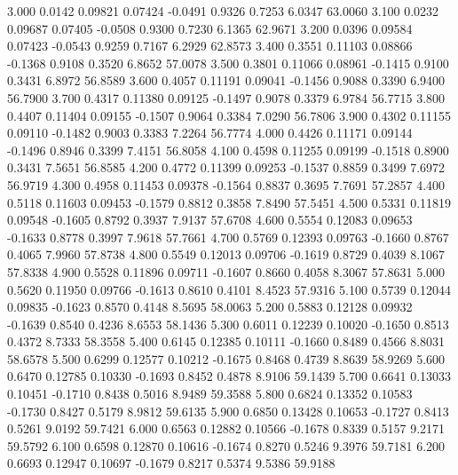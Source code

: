    3.000   0.0142   0.09821   0.07424  -0.0491   0.9326   0.7253   6.0347  63.0060
   3.100   0.0232   0.09687   0.07405  -0.0508   0.9300   0.7230   6.1365  62.9671
   3.200   0.0396   0.09584   0.07423  -0.0543   0.9259   0.7167   6.2929  62.8573
   3.400   0.3551   0.11103   0.08866  -0.1368   0.9108   0.3520   6.8652  57.0078
   3.500   0.3801   0.11066   0.08961  -0.1415   0.9100   0.3431   6.8972  56.8589
   3.600   0.4057   0.11191   0.09041  -0.1456   0.9088   0.3390   6.9400  56.7900
   3.700   0.4317   0.11380   0.09125  -0.1497   0.9078   0.3379   6.9784  56.7715
   3.800   0.4407   0.11404   0.09155  -0.1507   0.9064   0.3384   7.0290  56.7806
   3.900   0.4302   0.11155   0.09110  -0.1482   0.9003   0.3383   7.2264  56.7774
   4.000   0.4426   0.11171   0.09144  -0.1496   0.8946   0.3399   7.4151  56.8058
   4.100   0.4598   0.11255   0.09199  -0.1518   0.8900   0.3431   7.5651  56.8585
   4.200   0.4772   0.11399   0.09253  -0.1537   0.8859   0.3499   7.6972  56.9719
   4.300   0.4958   0.11453   0.09378  -0.1564   0.8837   0.3695   7.7691  57.2857
   4.400   0.5118   0.11603   0.09453  -0.1579   0.8812   0.3858   7.8490  57.5451
   4.500   0.5331   0.11819   0.09548  -0.1605   0.8792   0.3937   7.9137  57.6708
   4.600   0.5554   0.12083   0.09653  -0.1633   0.8778   0.3997   7.9618  57.7661
   4.700   0.5769   0.12393   0.09763  -0.1660   0.8767   0.4065   7.9960  57.8738
   4.800   0.5549   0.12013   0.09706  -0.1619   0.8729   0.4039   8.1067  57.8338
   4.900   0.5528   0.11896   0.09711  -0.1607   0.8660   0.4058   8.3067  57.8631
   5.000   0.5620   0.11950   0.09766  -0.1613   0.8610   0.4101   8.4523  57.9316
   5.100   0.5739   0.12044   0.09835  -0.1623   0.8570   0.4148   8.5695  58.0063
   5.200   0.5883   0.12128   0.09932  -0.1639   0.8540   0.4236   8.6553  58.1436
   5.300   0.6011   0.12239   0.10020  -0.1650   0.8513   0.4372   8.7333  58.3558
   5.400   0.6145   0.12385   0.10111  -0.1660   0.8489   0.4566   8.8031  58.6578
   5.500   0.6299   0.12577   0.10212  -0.1675   0.8468   0.4739   8.8639  58.9269
   5.600   0.6470   0.12785   0.10330  -0.1693   0.8452   0.4878   8.9106  59.1439
   5.700   0.6641   0.13033   0.10451  -0.1710   0.8438   0.5016   8.9489  59.3588
   5.800   0.6824   0.13352   0.10583  -0.1730   0.8427   0.5179   8.9812  59.6135
   5.900   0.6850   0.13428   0.10653  -0.1727   0.8413   0.5261   9.0192  59.7421
   6.000   0.6563   0.12882   0.10566  -0.1678   0.8339   0.5157   9.2171  59.5792
   6.100   0.6598   0.12870   0.10616  -0.1674   0.8270   0.5246   9.3976  59.7181
   6.200   0.6693   0.12947   0.10697  -0.1679   0.8217   0.5374   9.5386  59.9188
